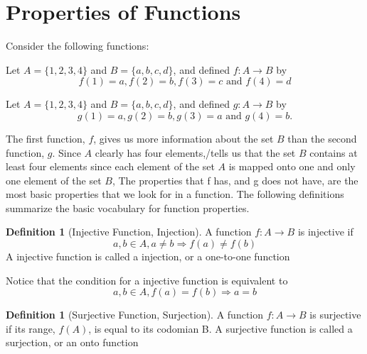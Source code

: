 \documentclass[10pt,]{book}
\theoremstyle{plain}
\theoremstyle{definition}
\newtheorem{definition}[theorem]{Definition}
\theoremstyle{definition}
\theoremstyle{definition}
\begin{document}
\section[Properties of Functions ]{Properties of Functions }\label{s-properties-of-functions}
Consider the following functions:%
\par
Let \(A = \{1, 2, 3, 4\}\) and \(B = \{a, b, c, d\}\), and defined \(f:A \rightarrow  B\) by 
\begin{equation*}f(1) = a, f(2) = b, f(3) = c \textrm{ and } f(4) = d\end{equation*}
%
\par
Let \(A = \{1, 2, 3, 4\}\) and \(B = \{a, b, c, d\}\), and defined \(g:A \rightarrow  B\) by 
\begin{equation*}g(1) = a , g(2) = b, g(3) = a \textrm{ and } g(4) = b.\end{equation*}
%
\par
The first function, \(f\), gives us more information about the set \(B\) than the second function, \(g\). Since \(A\) clearly has four elements,/tells us that the set \(B\) contains at least four elements since each element of the set \(A\) is mapped onto one and only one element of the set \(B\), The properties that f has, and g does not have, are the most basic properties that we look for in a function. The following definitions summarize the basic vocabulary for function properties.%
\begin{definition}[Injective Function, Injection]\label{def-injective-function}
A function \(f: A \rightarrow B\) is injective if \begin{equation*} a, b\in  A, a\neq b \Rightarrow  f(a) \neq  f(b)\end{equation*}  A injective function is called a injection, or a one-to-one function%
\end{definition}
\par
Notice that the condition for a injective function is equivalent to
  \[a, b\in  A, f(a) = f(b) \Rightarrow  a = b\] 
%
\begin{definition}[Surjective Function, Surjection]\label{def-surjective-function}
A function \(f: A \rightarrow B\) is surjective if its range, \(f(A)\), is equal to its codomian B.  A surjective function is called a surjection, or an onto function%
\end{definition}
\par
\end{document}

